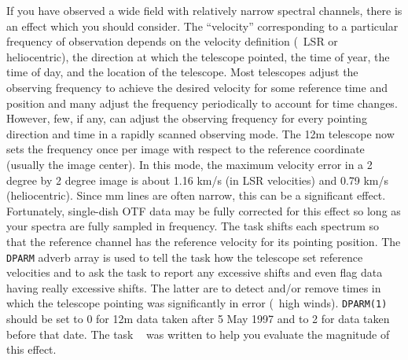      If you have observed a wide field with relatively narrow spectral
channels, there is an effect which you should consider.  The
``velocity'' corresponding to a particular frequency of observation
depends on the velocity definition (\eg\ LSR or heliocentric), the
direction at which the telescope pointed, the time of year, the time
of day, and the location of the telescope.  Most telescopes adjust the
observing frequency to achieve the desired velocity for some reference
time and position and many adjust the frequency periodically to
account for time changes.  However, few, if any, can adjust the
observing frequency for every pointing direction and time in a rapidly
scanned  observing mode.  The 12m telescope now sets
the frequency once per image with respect to the reference coordinate
(usually the image center).  In this mode, the maximum velocity error
in a 2 degree by 2 degree image is about 1.16 km/s (in LSR velocities)
and 0.79 km/s (heliocentric).  Since mm lines are often narrow, this
can be a significant effect.  Fortunately, single-dish OTF data may be
fully corrected for this effect so long as your spectra are fully
sampled in frequency.  The task {\tt {}} shifts each
spectrum so that the reference channel has the reference velocity for
its pointing position.  The {\tt DPARM} adverb array is used to tell
the task how the telescope set reference velocities and to ask the
task to report any excessive shifts and even flag data having really
excessive shifts.  The latter are to detect and/or remove times in
which the telescope pointing was significantly in error (\ie\ high
winds).  {\tt DPARM(1)} should be set to 0 for 12m data taken after 5
May 1997 and to 2 for data taken before that date.  The task {\tt
{}} was written to help you evaluate the magnitude of this
effect.


